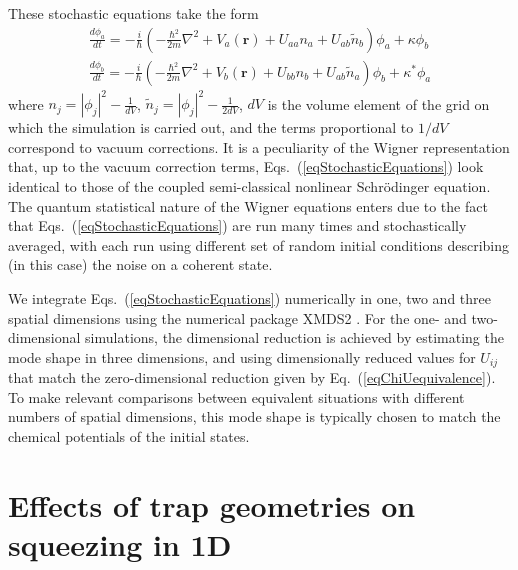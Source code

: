 \documentclass{iopart}
\begin{document}
These stochastic equations take the form
\begin{eqnarray}
\frac{d \phi_a}{dt} = -\frac{i}{\hbar}\left(-\frac{\hbar^2}{2 m}\nabla^2+V_a(\mathbf{r}) + U_{a a} n_a + U_{a b} \tilde{n}_b  \right)\phi_a   + \kappa \phi_b  \nonumber \\
\frac{d \phi_b}{dt} = -\frac{i}{\hbar}\left(-\frac{\hbar^2}{2 m}\nabla^2+V_b(\mathbf{r}) + U_{b b} n_b + U_{a b} \tilde{n}_a   \right)\phi_b   + \kappa^* \phi_a
  \label{eqStochasticEquations}
\end{eqnarray}
where $n_j=\left|\phi_{j}\right|^2 -\frac{1}{dV}$, $\tilde{n}_j=\left|\phi_{j}\right|^2 -\frac{1}{2 dV}$, $dV$ is the volume element of the grid on which the simulation is carried out, and the terms proportional to $1/dV$ correspond to vacuum corrections. It is a peculiarity of the Wigner representation that, up to the vacuum correction terms, Eqs.~(\ref{eqStochasticEquations}) look identical to those of the coupled semi-classical nonlinear Schr{\"{o}}dinger equation. The quantum statistical nature of the Wigner equations enters due to the fact that Eqs.~(\ref{eqStochasticEquations}) are run many times and stochastically averaged, with each run using different set of random initial conditions describing (in this case) the noise on a coherent state.

We integrate Eqs.~(\ref{eqStochasticEquations}) numerically in one, two and three spatial dimensions using the numerical package XMDS2 \cite{dennis2013}.  For the one- and two-dimensional simulations, the dimensional reduction is achieved by estimating the mode shape in three dimensions, and using dimensionally reduced values for $U_{ij}$ that match the zero-dimensional reduction given by Eq.~(\ref{eqChiUequivalence}).  To make relevant comparisons between equivalent situations with different numbers of spatial dimensions, this mode shape is typically chosen to match the chemical potentials of the initial states.  

\section{Effects of trap geometries on squeezing in 1D} \label{sec:1Dsim}
\end{document}
